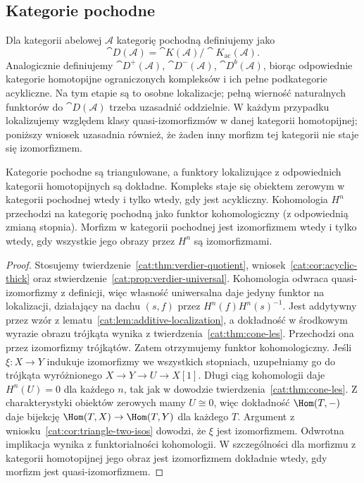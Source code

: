 \subsection{Kategorie pochodne}
\begin{definicja}\label{cat:def:derived-category}
Dla kategorii abelowej $\mathcal A$ kategorię pochodną definiujemy jako
\[
 \cat D(\mathcal A)=\cat K(\mathcal A)/\cat K_{\mathrm{ac}}(\mathcal A).
\]
Analogicznie definiujemy $\cat D^+(\mathcal A)$, $\cat D^-(\mathcal A)$, $\cat D^b(\mathcal A)$, biorąc odpowiednie kategorie homotopijne ograniczonych kompleksów i ich pełne podkategorie acykliczne. Na tym etapie są to osobne lokalizacje; pełną wierność naturalnych funktorów do $\cat D(\mathcal A)$ trzeba uzasadnić oddzielnie. W każdym przypadku lokalizujemy względem klasy quasi-izomorfizmów w danej kategorii homotopijnej; poniższy wniosek uzasadnia również, że żaden inny morfizm tej kategorii nie staje się izomorfizmem.
\end{definicja}
\begin{wniosek}\label{cat:cor:derived-triangulated}
Kategorie pochodne są triangulowane, a funktory lokalizujące z odpowiednich kategorii homotopijnych są dokładne. Kompleks staje się obiektem zerowym w kategorii pochodnej wtedy i tylko wtedy, gdy jest acykliczny. Kohomologia $H^n$ przechodzi na kategorię pochodną jako funktor kohomologiczny (z odpowiednią zmianą stopnia). Morfizm w kategorii pochodnej jest izomorfizmem wtedy i tylko wtedy, gdy wszystkie jego obrazy przez $H^n$ są izomorfizmami.
\end{wniosek}
\begin{proof}
Stosujemy twierdzenie~\ref{cat:thm:verdier-quotient}, wniosek~\ref{cat:cor:acyclic-thick} oraz stwierdzenie~\ref{cat:prop:verdier-universal}. Kohomologia odwraca quasi-izomorfizmy z definicji, więc własność uniwersalna daje jedyny funktor na lokalizacji, działający na dachu $(s,f)$ przez $H^n(f)H^n(s)^{-1}$. Jest addytywny przez wzór z lematu~\ref{cat:lem:additive-localization}, a dokładność w środkowym wyrazie obrazu trójkąta wynika z twierdzenia~\ref{cat:thm:cone-les}. Przechodzi ona przez izomorfizmy trójkątów. Zatem otrzymujemy funktor kohomologiczny. Jeśli $\xi:X\to Y$ indukuje izomorfizmy we wszystkich stopniach, uzupełniamy go do trójkąta wyróżnionego $X\to Y\to U\to X[1]$. Długi ciąg kohomologii daje $H^n(U)=0$ dla każdego $n$, tak jak w dowodzie twierdzenia~\ref{cat:thm:cone-les}. Z charakterystyki obiektów zerowych mamy $U\cong0$, więc dokładność $\Hom(T,-)$ daje bijekcję $\Hom(T,X)\to\Hom(T,Y)$ dla każdego $T$. Argument z wniosku~\ref{cat:cor:triangle-two-isos} dowodzi, że $\xi$ jest izomorfizmem. Odwrotna implikacja wynika z funktorialności kohomologii. W szczególności dla morfizmu z kategorii homotopijnej jego obraz jest izomorfizmem dokładnie wtedy, gdy morfizm jest quasi-izomorfizmem.
\end{proof}

